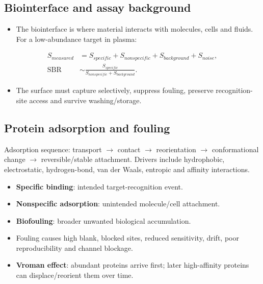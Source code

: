 \documentclass[10pt,a4paper]{ctexart}
\newcommand{\key}[1]{\textbf{#1}}
\newcommand{\formula}[1]{%
	\par\vspace{1pt}\begingroup
	\setlength{\abovedisplayskip}{0pt}\setlength{\belowdisplayskip}{0pt}
	\[ #1 \]\endgroup\vspace{1pt}}
\begin{document}
\begin{multicols*}{2}
\subsection{Biointerface and assay background}
\begin{itemize}
	\item The biointerface is where material interacts with molecules, cells and fluids. For a low-abundance target in plasma:
\end{itemize}
\formula{\begin{aligned}
S_{measured}&=S_{specific}+S_{nonspecific}+S_{background}+S_{noise},\\
\mathrm{SBR}&\sim\frac{S_{specific}}{S_{nonspecific}+S_{background}}.
\end{aligned}}
\begin{itemize}
	\item The surface must capture selectively, suppress fouling, preserve recognition-site access and survive washing/storage.
\end{itemize}

\subsection{Protein adsorption and fouling}
Adsorption sequence: transport \(\rightarrow\) contact \(\rightarrow\) reorientation \(\rightarrow\) conformational change \(\rightarrow\) reversible/stable attachment. Drivers include hydrophobic, electrostatic, hydrogen-bond, van der Waals, entropic and affinity interactions.
\begin{itemize}
	\item \key{Specific binding}: intended target-recognition event.
	\item \key{Nonspecific adsorption}: unintended molecule/cell attachment.
	\item \key{Biofouling}: broader unwanted biological accumulation.
	\item Fouling causes high blank, blocked sites, reduced sensitivity, drift, poor reproducibility and channel blockage.
	\item \key{Vroman effect}: abundant proteins arrive first; later high-affinity proteins can displace/reorient them over time.
\end{itemize}


\end{multicols*}
\end{document}
